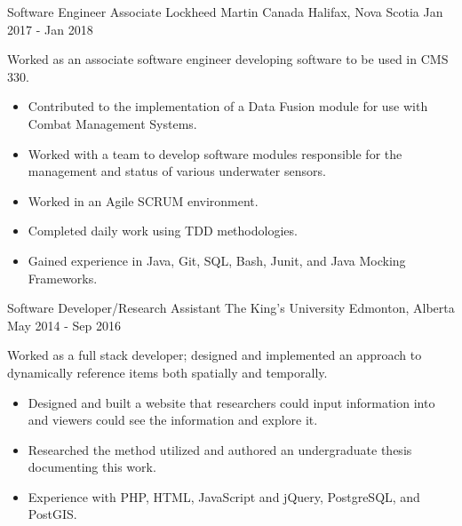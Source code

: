 \begin{cventries}
{\begin{itemize}
            \end{itemize}
        }
    \cventry
        {Software Engineer Associate}
        {Lockheed Martin Canada}
        {Halifax, Nova Scotia}
        {Jan 2017 - Jan 2018}
        {
            Worked as an associate software engineer developing software to be used in CMS 330.
            \begin{itemize}
                \item Contributed to the implementation of a Data Fusion module for use with Combat Management Systems.
                \item Worked with a team to develop software modules responsible for the management and status of various underwater sensors.
                \item Worked in an Agile SCRUM environment.
                \item Completed daily work using TDD methodologies.
                \item Gained experience in Java, Git, SQL, Bash, Junit, and Java Mocking Frameworks.
            \end{itemize}
        }
    \cventry
        {Software Developer/Research Assistant}
        {The King's University}
        {Edmonton, Alberta}
        {May 2014 - Sep 2016}
        {
            Worked as a full stack developer; designed and implemented an approach to dynamically reference items both spatially and temporally.
            \begin{itemize}
                \item Designed and built a website that researchers could input information into and viewers could see the information and explore it.
                \item Researched the method utilized and authored an undergraduate thesis documenting this work.
                \item Experience with PHP, HTML, JavaScript and jQuery, PostgreSQL, and PostGIS.
            \end{itemize}
        }

\end{cventries}